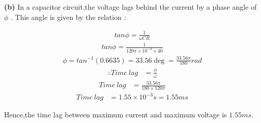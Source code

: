 \documentclass[journal,12pt,twocolumn]{IEEEtran}
\theoremstyle{remark}
\begin{document}
\begin{flushleft}\textbf{(b)} In a capacitor circuit,the voltage lags behind the current by a phase angle of $\phi$ . This angle is given by the relation
:\\
\end{flushleft}
\begin{align}
	\label{eq:tri-pts/13} tan\phi=\frac{1}{\omega CR}
\end{align}
\begin{align}
	\label{eq:tri-pts/14}tan\phi=\frac{1}{120\pi \times 10^{-4} \times 40}
\end{align}
\begin{align}
	\label{eq:tri-pts/15} \phi = tan^{-1} (0.6635)=33.56\deg =\frac{33.56\pi}{180}rad
\end{align}
\begin{align}
	\label{eq:tri-pts/16} \therefore Time\: lag &=\frac{\phi}{\omega}
\end{align}
\begin{align}
	\label{eq:tri-pts/17}Time\: lag &=\frac{33.56\pi}{180 \times 120\pi}
\end{align}
\begin{align}
	\label{eq:tri-pts/18}Time\: lag &=1.55 \times 10^{-3}s=1.55ms
\end{align}

Hence,the time lag between maximum current and maximum voltage is $1.55ms$.
\end{document}

